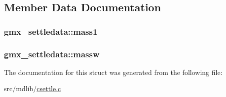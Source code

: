 \subsection{\-Member \-Data \-Documentation}
\hypertarget{structgmx__settledata_a4df40e6d1ce20463399e1701c48a7167}{
\subsubsection[{mass1}]{ {\bf gmx\-\_\-settledata\-::mass1}}}\label{structgmx__settledata_a4df40e6d1ce20463399e1701c48a7167}
\hypertarget{structgmx__settledata_ac95ea696e2f19c98bf4da7a3d3421650}{
\subsubsection[{massw}]{ {\bf gmx\-\_\-settledata\-::massw}}}\label{structgmx__settledata_ac95ea696e2f19c98bf4da7a3d3421650}


\-The documentation for this struct was generated from the following file\-:\begin{DoxyCompactItemize}
\item 
src/mdlib/\hyperlink{csettle_8c}{csettle.\-c}\end{DoxyCompactItemize}
